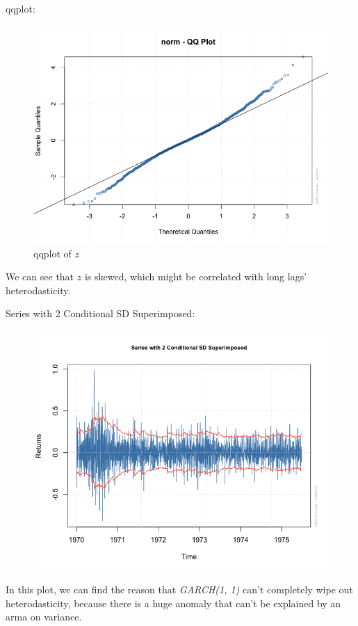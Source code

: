 \documentclass[a4paper, 11pt]{article}
\begin{document}
qqplot:
\begin{figure}[H]
\centering
\caption{qqplot of $z$}
\includegraphics[scale=.60]{qqplot.png}
\end{figure}

\indent We can see that $z$ is skewed, which might be correlated with long lags' heterodasticity.\par

Series with 2 Conditional SD Superimposed:
\begin{figure}[H]
\centering
\includegraphics[scale=.60]{series_sd.png}
\end{figure}
\indent In this plot, we can find the reason that \textit{GARCH(1, 1)} can't completely wipe out heterodasticity, because there is a huge anomaly that can't be explained by an arma on variance.
\end{document}
